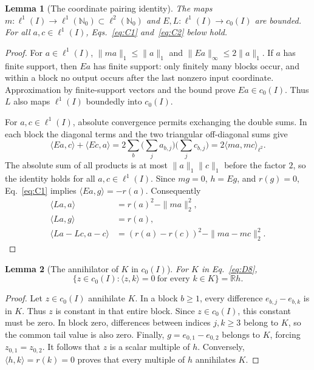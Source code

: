 \documentclass[11pt]{article}
\newcommand{\R}{\mathbb R}
\newcommand{\Nzero}{\mathbb N_0}
\newcommand{\pair}[2]{\langle #1,#2\rangle}
\newtheorem{lemma}{Lemma}
\theoremstyle{definition}
\theoremstyle{remark}
\begin{document}
\begin{lemma}[The coordinate pairing identity]
\label{lem:coordinate-pairing}
The maps $m:\ell^1(I)\to\ell^1(\Nzero)\subset\ell^2(\Nzero)$ and
$E,L:\ell^1(I)\to c_0(I)$ are bounded. For all $a,c\in\ell^1(I)$,
Eqs.~\eqref{eq:C1} and~\eqref{eq:C2} below hold.
\end{lemma}
\begin{proof}
\label{sec:C1}
For $a\in\ell^1(I)$, $\|ma\|_1\le\|a\|_1$ and
$\|Ea\|_\infty\le2\|a\|_1$. If $a$ has finite support, then $Ea$ has
finite support: only finitely many blocks occur, and within a block no
output occurs after the last nonzero input coordinate. Approximation by
finite-support vectors and the bound prove $Ea\in c_0(I)$.
Thus $L$ also maps $\ell^1(I)$ boundedly into $c_0(I)$.

For $a,c\in\ell^1(I)$, absolute convergence permits exchanging the double
sums. In each block the diagonal terms and the two triangular
off-diagonal sums give
\begin{equation}
\pair{Ea}{c}+\pair{Ec}{a}
 =2\sum_b\Big(\sum_j a_{b,j}\Big)\Big(\sum_j c_{b,j}\Big)
 =2\pair{ma}{mc}_{\ell^2}.
\label{eq:C1}
\end{equation}
The absolute sum of all products is at most $\|a\|_1\|c\|_1$ before the
factor $2$, so the identity holds for all $a,c\in\ell^1(I)$. Since $mg=0$, $h=Eg$,
and $r(g)=0$, Eq.~\eqref{eq:C1} implies $\pair{Ea}{g}=-r(a)$.
Consequently
\begin{equation}
\begin{aligned}
\pair{La}{a}&=r(a)^2-\|ma\|_2^2,\\
\pair{La}{g}&=r(a),\\
\pair{La-Lc}{a-c}&=(r(a)-r(c))^2-\|ma-mc\|_2^2.
\end{aligned}
\label{eq:C2}
\end{equation}
\end{proof}

\begin{lemma}[The annihilator of $K$ in $c_0(I)$]
\label{lem:coordinate-annihilator}
For $K$ in Eq.~\eqref{eq:D8},
\[
\{z\in c_0(I):\pair{z}{k}=0\ \text{for every }k\in K\}=\R h.
\]
\end{lemma}
\begin{proof}
Let $z\in c_0(I)$ annihilate $K$. In a block $b\ge1$, every
difference $e_{b,j}-e_{b,k}$ is in $K$. Thus $z$ is constant in that
entire block. Since $z\in c_0(I)$, this constant must be zero. In block
zero, differences between indices $j,k\ge3$ belong to $K$, so the common
tail value is also zero. Finally, $g=e_{0,1}-e_{0,2}$ belongs to $K$,
forcing $z_{0,1}=z_{0,2}$. It follows that $z$ is a scalar multiple of
$h$. Conversely, $\pair{h}{k}=r(k)=0$ proves that every multiple of $h$
annihilates $K$.
\end{proof}
\end{document}
